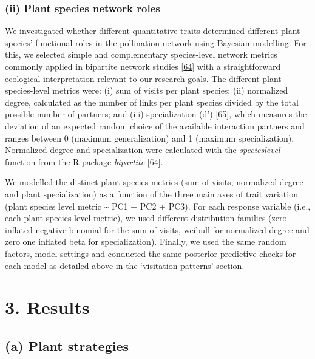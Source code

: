\documentclass[
  12pt,
  a4paper,
]{article}
\begin{document}
\hypertarget{ii-plant-species-network-roles}{%
\subsubsection{(ii) Plant species network roles}\label{ii-plant-species-network-roles}}

We investigated whether different quantitative traits determined different plant species' functional roles in the pollination network using Bayesian modelling. For this, we selected simple and complementary species-level network metrics commonly applied in bipartite network studies {[}\protect\hyperlink{ref-dormann2008}{64}{]} with a straightforward ecological interpretation relevant to our research goals. The different plant species-level metrics were: (i) sum of visits per plant species; (ii) normalized degree, calculated as the number of links per plant species divided by the total possible number of partners; and (iii) specialization (d') {[}\protect\hyperlink{ref-bluthgen2006}{65}{]}, which measures the deviation of an expected random choice of the available interaction partners and ranges between 0 (maximum generalization) and 1 (maximum specialization). Normalized degree and specialization were calculated with the \emph{specieslevel} function from the R package \emph{bipartite} {[}\protect\hyperlink{ref-dormann2008}{64}{]}.

We modelled the distinct plant species metrics (sum of visits, normalized degree and plant specialization) as a function of the three main axes of trait variation (plant species level metric \textasciitilde{} PC1 + PC2 + PC3). For each response variable (i.e., each plant species level metric), we used different distribution families (zero inflated negative binomial for the sum of visits, weibull for normalized degree and zero one inflated beta for specialization). Finally, we used the same random factors, model settings and conducted the same posterior predictive checks for each model as detailed above in the `visitation patterns' section.

\hypertarget{results}{%
\section{3. Results}\label{results}}

\hypertarget{a-plant-strategies}{%
\subsection{(a) Plant strategies}\label{a-plant-strategies}}
\end{document}
